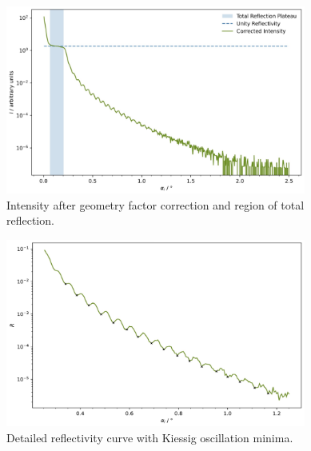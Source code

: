\begin{figure}[H]
	\centering
	\includegraphics[width=0.88\textwidth]{content/plots/6.jpg}
	\caption{Intensity after geometry factor correction and region of total reflection.}
	\label{fig:geom-corr}
\end{figure}

\vspace{3em}

\begin{figure}[H]
	\centering
	\includegraphics[width=0.88\textwidth]{content/plots/7.jpg}
	\caption{Detailed reflectivity curve with Kiessig oscillation minima.}
	\label{fig:kiessig-peaks}
\end{figure}

\newpage

